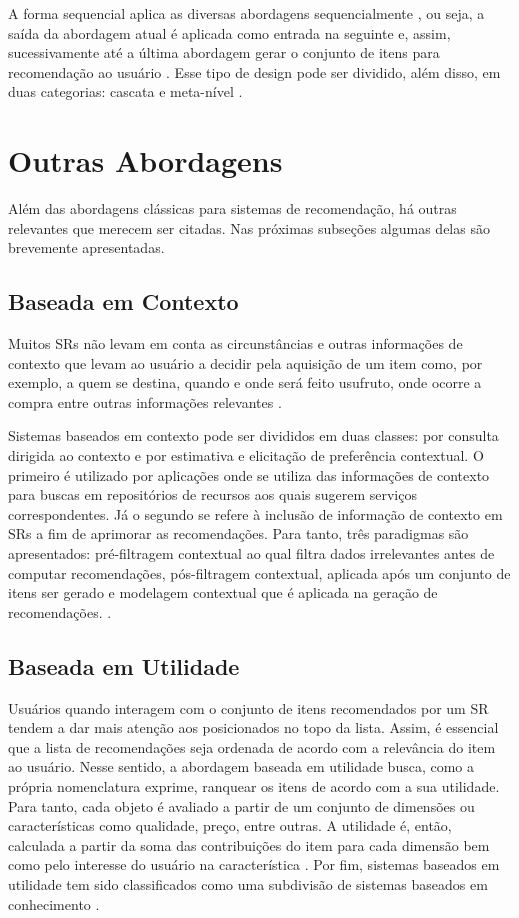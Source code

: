     A forma sequencial aplica as diversas abordagens sequencialmente \cite{Jannach2010}, ou seja, a saída da abordagem atual é aplicada como entrada na seguinte e, assim, sucessivamente até a última abordagem gerar o conjunto de itens para recomendação ao usuário \cite{Burke2002}. Esse tipo de design pode ser dividido, além disso, em duas categorias: cascata e meta-nível \cite{Jannach2010}.
    

\section{Outras Abordagens}
    
    Além das abordagens clássicas para sistemas de recomendação, há outras relevantes que merecem ser citadas. Nas próximas subseções algumas delas são brevemente apresentadas.
    
    \subsection{Baseada em Contexto}
    
    Muitos SRs não levam em conta as circunstâncias e outras informações de contexto que levam ao usuário a decidir pela aquisição de um item como, por exemplo, a quem se destina, quando e onde será feito usufruto, onde ocorre a compra entre outras informações relevantes \cite{Ricci2010, Panniello2012}.
    
    Sistemas baseados em contexto pode ser divididos em duas classes: por consulta dirigida ao contexto e por estimativa e elicitação de preferência contextual. O primeiro é utilizado por aplicações onde se utiliza das informações de contexto para buscas em repositórios de recursos aos quais sugerem serviços correspondentes. Já o segundo se refere à inclusão de informação de contexto em SRs a fim de aprimorar as recomendações. Para tanto, três paradigmas são apresentados: pré-filtragem contextual ao qual filtra dados irrelevantes antes de computar recomendações, pós-filtragem contextual, aplicada após um conjunto de itens ser gerado e modelagem contextual que é aplicada na geração de recomendações. \cite{Panniello2012}.
    
    \subsection{Baseada em Utilidade}
    
    Usuários quando interagem com o conjunto de itens recomendados por um SR tendem a dar mais atenção aos posicionados no topo da lista. Assim, é essencial que a lista de recomendações seja ordenada de acordo com a relevância do item ao usuário. Nesse sentido, a abordagem baseada em utilidade busca, como a própria nomenclatura exprime, ranquear os itens de acordo com a sua utilidade. Para tanto, cada objeto é avaliado a partir de um conjunto de dimensões ou características como qualidade, preço, entre outras. A utilidade é, então, calculada a partir da soma das contribuições do item para cada dimensão bem como pelo interesse do usuário na característica \cite{Jannach2010}. Por fim, sistemas baseados em utilidade tem sido classificados como uma subdivisão de sistemas baseados em conhecimento \cite{Aggarwal2016}.
    
